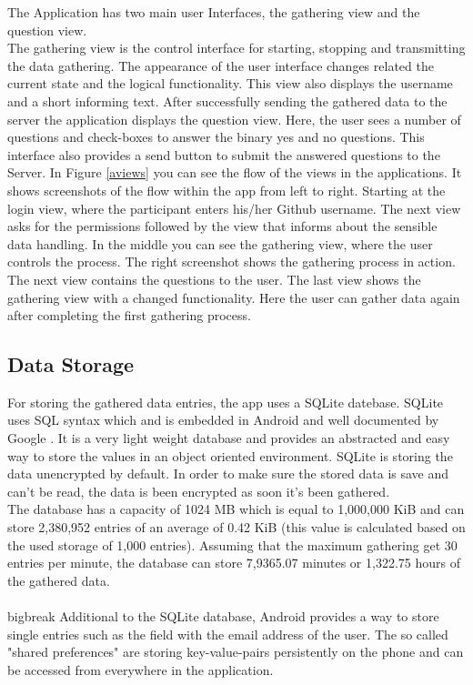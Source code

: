 The Application has two main user Interfaces, the gathering view and the question view.\\
The gathering view is the control interface for starting, stopping and transmitting the data gathering. The appearance of the user interface changes related the current state and the logical functionality. 
This view also displays the username and a short informing text.
\bigbreak
After successfully sending the gathered data to the server the application displays the question view. Here, the user sees a number of questions and check-boxes to answer the binary yes and no questions. 
This interface also provides a send button to submit the answered questions to the Server.
\bigbreak
In Figure \ref{aviews} you can see the flow of the views in the applications.
It shows screenshots of the flow within the app from left to right. Starting at the login view, where the participant enters his/her Github username. 
The next view asks for the permissions followed by the view that informs about the sensible data handling. 
In the middle you can see the gathering view, where the user controls the process. The right screenshot shows the gathering process in action. The next view contains the questions to the user. The last view shows the gathering view with a changed functionality. Here the user can gather data again after completing the first gathering process. 

\subsection{Data Storage}
For storing the gathered data entries, the app uses a SQLite datebase. SQLite uses SQL syntax which and is embedded in Android and well documented by Google \cite{vogel2010android}. It is a very light weight database and provides an abstracted and easy way to store the values in an object oriented environment. SQLite is storing the data unencrypted by default. In order to make sure the stored data is save and can't be read, the data is been encrypted as soon it's been gathered.\\
The database has a capacity of 1024 MB which is equal to 1,000,000 KiB and can store 2,380,952 entries of an average of 0.42 KiB (this value is calculated based on the used storage of 1,000 entries). Assuming that the maximum gathering get 30 entries per minute, the database can store 7,9365.07 minutes or 1,322.75 hours of the gathered data.\\
\\bigbreak
Additional to the SQLite database, Android provides a way to store single entries such as the field with the email address of the user. The so called "shared preferences" are storing key-value-pairs persistently on the phone and can be accessed from everywhere in the application.


